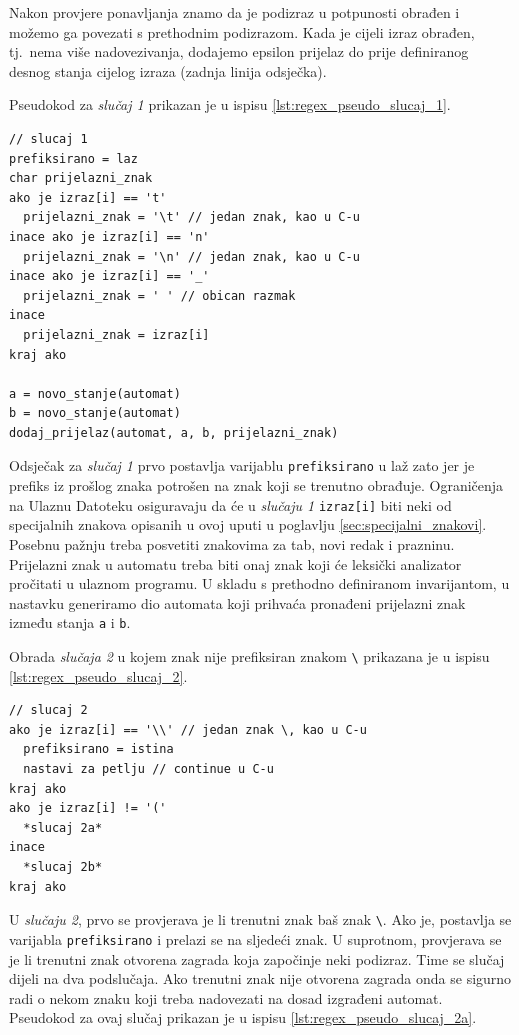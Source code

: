 \documentclass[times, 12pt, utf8]{book}
\begin{document}
Nakon provjere ponavljanja znamo da je podizraz u potpunosti obrađen i možemo ga povezati s prethodnim podizrazom.
Kada je cijeli izraz obrađen, tj.~nema više nadovezivanja, dodajemo epsilon prijelaz do prije definiranog desnog stanja cijelog izraza (zadnja linija odsječka).

Pseudokod za \emph{slučaj 1} prikazan je u ispisu \ref{lst:regex_pseudo_slucaj_1}.

\begin{lstlisting}[caption={Slučaj 1 u funkciji \texttt{pretvori}.},label=lst:regex_pseudo_slucaj_1]
// slucaj 1
prefiksirano = laz
char prijelazni_znak
ako je izraz[i] == 't'
  prijelazni_znak = '\t' // jedan znak, kao u C-u
inace ako je izraz[i] == 'n'
  prijelazni_znak = '\n' // jedan znak, kao u C-u
inace ako je izraz[i] == '_'
  prijelazni_znak = ' ' // obican razmak
inace
  prijelazni_znak = izraz[i]
kraj ako

a = novo_stanje(automat)
b = novo_stanje(automat)
dodaj_prijelaz(automat, a, b, prijelazni_znak)
\end{lstlisting}

Odsječak za \emph{slučaj 1} prvo postavlja varijablu \verb|prefiksirano| u laž zato jer je prefiks iz prošlog znaka potrošen na znak koji se trenutno obrađuje.
Ograničenja na Ulaznu Datoteku osiguravaju da će u \emph{slučaju 1} \verb|izraz[i]| biti neki od specijalnih znakova opisanih u ovoj uputi u poglavlju \ref{sec:specijalni_znakovi}.
Posebnu pažnju treba posvetiti znakovima za tab, novi redak i prazninu.
Prijelazni znak u automatu treba biti onaj znak koji će leksički analizator pročitati u ulaznom programu.
U skladu s prethodno definiranom invarijantom, u nastavku generiramo dio automata koji prihvaća pronađeni prijelazni znak između stanja \verb|a| i \verb|b|.

Obrada \emph{slučaja 2} u kojem znak nije prefiksiran znakom \verb|\| prikazana je u ispisu \ref{lst:regex_pseudo_slucaj_2}.

\begin{lstlisting}[caption={Slučaj 2 u funkciji \texttt{pretvori}.},label=lst:regex_pseudo_slucaj_2]
// slucaj 2
ako je izraz[i] == '\\' // jedan znak \, kao u C-u
  prefiksirano = istina
  nastavi za petlju // continue u C-u
kraj ako
ako je izraz[i] != '('
  *slucaj 2a*
inace
  *slucaj 2b*
kraj ako
\end{lstlisting}

U \emph{slučaju 2}, prvo se provjerava je li trenutni znak baš znak \verb|\|.
Ako je, postavlja se varijabla \verb|prefiksirano| i prelazi se na sljedeći znak.
U suprotnom, provjerava se je li trenutni znak otvorena zagrada koja započinje neki podizraz.
Time se slučaj dijeli na dva podslučaja.
Ako trenutni znak nije otvorena zagrada onda se sigurno radi o nekom znaku koji treba nadovezati na dosad izgrađeni automat.
Pseudokod za ovaj slučaj prikazan je u ispisu \ref{lst:regex_pseudo_slucaj_2a}.
\end{document}
